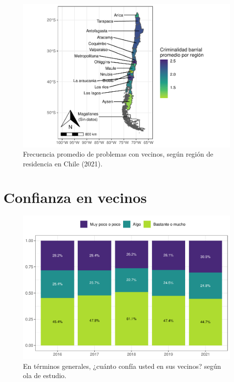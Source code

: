 \documentclass[
  12pt,
  openany]{book}
\begin{document}
\begin{figure}

{\centering \includegraphics{reporte-elsoc_files/figure-latex/confli-region-1} 

}

\caption{Frecuencia promedio de problemas con vecinos, según región de residencia en Chile (2021).}\label{fig:confli-region}
\end{figure}

\hypertarget{confianza-en-vecinos}{%
\section{Confianza en vecinos}\label{confianza-en-vecinos}}

\begin{figure}

{\centering \includegraphics{reporte-elsoc_files/figure-latex/vecinos-ola-1} 

}

\caption{En términos generales, ¿cuánto confía usted en sus vecinos? según ola de estudio.}\label{fig:vecinos-ola}
\end{figure}
\end{document}
